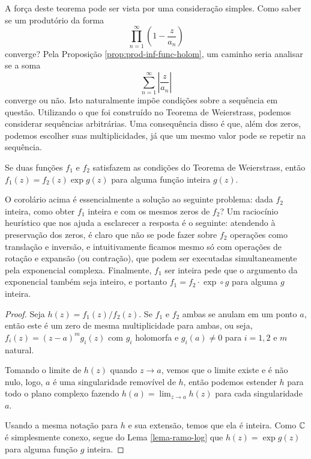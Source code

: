     A força deste teorema pode ser vista por uma consideração simples. 
    Como saber se um produtório da forma
    $$\prod_{n=1}^{\infty} \left( 1 - \frac{z}{a_n} \right)$$
    converge? Pela Proposição \ref{prop:prod-inf-func-holom}, 
    um caminho seria analisar se a soma 
    \[
    \sum_{n=1}^{\infty} \left | \frac{z}{a_n} \right |
    \]
    converge ou não. Isto naturalmente impõe condições sobre a sequência em questão. 
    Utilizando o que foi construído no Teorema de Weierstrass, 
    podemos considerar sequências arbitrárias. Uma consequência disso é que, 
    além dos zeros, podemos escolher suas multiplicidades, 
    já que um mesmo valor pode se repetir na sequência.
    \begin{corolario}
    Se duas funções $f_1$ e $f_2$ satisfazem as 
    condições do Teorema de Weierstrass, então $f_1(z) = f_2(z)\exp{g(z)}$ 
    para alguma função inteira $g(z)$. 
    \end{corolario}
    \begin{observacao}
        O corolário acima é essencialmente a solução ao seguinte problema:
        dada $f_2$ inteira, como obter $f_1$ 
        inteira e com os mesmos zeros de $f_2$?
        Um raciocínio heurístico que nos ajuda a 
        esclarecer a resposta é o seguinte:
        atendendo à preservação dos zeros, 
        é claro que não se pode fazer sobre $f_2$ 
        operações como translação e inversão, e intuitivamente 
        ficamos mesmo só com operações de rotação e 
        expansão (ou contração), que podem ser executadas 
        simultaneamente pela exponencial complexa.
        Finalmente, $f_1$ ser inteira pede que o 
        argumento da exponencial também seja inteiro, 
        e portanto $f_1=f_2\cdot\exp\circ g$ para alguma $g$ inteira.
    \end{observacao}
    \begin{proof}
    Seja $h(z) = f_1(z)/f_2(z)$. Se $f_1$ e $f_2$ 
    ambas se anulam em um ponto $a$, 
    então este é um zero de mesma multiplicidade para ambas, 
    ou seja, $f_i(z) = (z-a)^mg_i(z)$ com $g_i$ holomorfa e 
    $g_i(a) \neq 0$ para  $i = 1,2$ e $m$ natural. 
    
    Tomando o limite de $h(z)$ quando $z \to a$, 
    vemos que o limite existe e é não nulo, logo, 
    $a$ é uma singularidade removível de $h$, então podemos estender $h$ 
    para todo o plano complexo fazendo 
    $h(a) = \lim_{z \to a} h(z)$ para cada singularidade $a$.
    
    Usando a mesma notação para $h$ e sua extensão, temos que ela é inteira. 
    Como $\mathbb{C}$ é simplesmente conexo, 
    segue do Lema \ref{lema-ramo-log} que $h(z) = \exp{g(z)}$ 
    para alguma função $g$ inteira.
    \end{proof}
    
